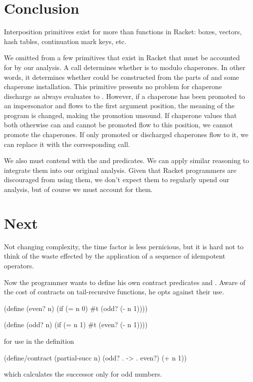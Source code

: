 \section{Conclusion}

Interposition primitives exist for more than functions in Racket: boxes, vectors, hash tables, continuation mark keys, etc.

We omitted from \chapcalc a few primitives that exist in Racket that must be accounted for by our analysis.
A call  determines whether  is  to  modulo chaperones.
In other words, it determines whether  could be constructed from the parts of  and some chaperone installation.
This primitive presents no problem for chaperone discharge as  always evaluates to .
However, if a chaperone has been promoted to an impersonator and flows to the first argument position, the meaning of the program is changed, making the promotion unsound.
If chaperone values that both otherwise can and cannot be promoted flow to this position, we cannot promote the chaperones.
If only promoted or discharged chaperones flow to it, we can replace it with the corresponding  call.

We also must contend with the  and  predicates. We can apply similar reasoning to integrate them into our original analysis.
Given that Racket programmers are discouraged from using them, we don't expect them to regularly upend our analysis, but of course we must account for them.

\section{Next}

Not changing complexity, the time factor is less pernicious, but it is hard not to think of the waste effected by the application of a sequence of idempotent operators.

Now the programmer wants to define his own contract predicates  and . Aware of the cost of contracts on tail-recursive functions, he opts against their use.
\begin{schemedisplay}
(define (even? n)
  (if (= n 0)
      #t
      (odd? (- n 1))))
      
(define (odd? n)
  (if (= n 1)
      #t
      (even? (- n 1))))
\end{schemedisplay}
for use in the definition
\begin{schemedisplay}
(define/contract (partial-succ n)
  (odd? . -> . even?)
  (+ n 1))
\end{schemedisplay}
which calculates the successor only for odd numbers.

